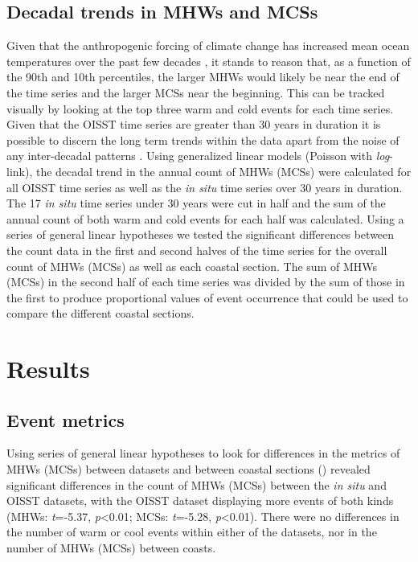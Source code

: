 \documentclass[a4paper,10pt,review]{elsarticle}
\begin{document}
\subsection{Decadal trends in MHWs and MCSs}
Given that the anthropogenic forcing of climate change has increased mean ocean temperatures over the past few decades \citep{IPCC2014}, it stands to reason that, as a function of the 90th and 10th percentiles, the larger MHWs would likely be near the end of the time series and the larger MCSs near the beginning. This can be tracked visually by looking at the top three warm and cold events for each time series. Given that the OISST time series are greater than 30 years in duration it is possible to discern the long term trends within the data apart from the noise of any inter-decadal patterns \citep{Schlegel2016}. Using generalized linear models (Poisson with \emph{log}-link), the decadal trend in the annual count of MHWs (MCSs) were calculated for all OISST time series as well as the \emph{in situ} time series over 30 years in duration. The 17 \emph{in situ} time series under 30 years were cut in half and the sum of the annual count of both warm and cold events for each half was calculated. Using a series of general linear hypotheses \citep{Hothorn2008} we tested the significant differences between the count data in the first and second halves of the time series for the overall count of MHWs (MCSs) as well as each coastal section. The sum of MHWs (MCSs) in the second half of each time series was divided by the sum of those in the first to produce proportional values of event occurrence that could be used to compare the different coastal sections.

\section{Results}

\subsection{Event metrics}
Using series of general linear hypotheses \citep{Hothorn2008} to look for differences in the metrics of MHWs (MCSs) between datasets and between coastal sections () revealed significant differences in the count of MHWs (MCSs) between the \emph{in situ} and OISST datasets, with the OISST dataset displaying more events of both kinds (MHWs: \emph{t}=-5.37, \emph{p}<0.01; MCSs: \emph{t}=-5.28, \emph{p}<0.01). There were no differences in the number of warm or cool events within either of the datasets, nor in the number of MHWs (MCSs) between coasts.
\end{document}
